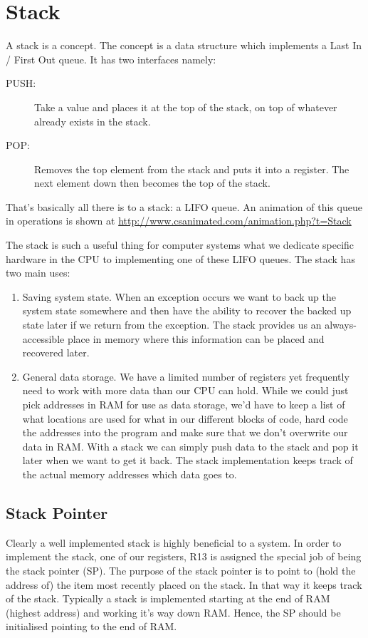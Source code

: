 \chapter{Stack}
A stack is a concept. The concept is a data structure which implements a Last In / First Out queue. It has two interfaces namely:
\begin{description}
    \item[PUSH:] Take a value and places it at the top of the stack, on top of whatever already exists in the stack.
    \item[POP:] Removes the top element from the stack and puts it into a register. The next element down then becomes the top of the stack.
\end{description}

That's basically all there is to a stack: a LIFO queue. An animation of this queue in operations is shown at \url{http://www.csanimated.com/animation.php?t=Stack}

The stack is such a useful thing for computer systems what we dedicate specific hardware in the CPU to implementing one of these LIFO queues. The stack has two main uses:
\begin{enumerate}
    \item Saving system state. When an exception occurs we want to back up the system state somewhere and then have the ability to recover the backed up state later if we return from the exception. The stack provides us an always-accessible place in memory where this information can be placed and recovered later.
    \item General data storage. We have a limited number of registers yet frequently need to work with more data than our CPU can hold. While we could just pick addresses in RAM for use as data storage, we'd have to keep a list of what locations are used for what in our different blocks of code, hard code the addresses into the program and make sure that we don't overwrite our data in RAM. With a stack we can simply push data to the stack and pop it later when we want to get it back. The stack implementation keeps track of the actual memory addresses which data goes to. 
\end{enumerate}

\section{Stack Pointer}
Clearly a well implemented stack is highly beneficial to a system. In order to implement the stack, one of our registers, R13 is assigned the special job of being the stack pointer (SP). The purpose of the stack pointer is to point to (hold the address of) the item most recently placed on the stack. In that way it keeps track of the stack. Typically a stack is implemented starting at the end of RAM (highest address) and working it's way down RAM. Hence, the SP should be initialised pointing to the end of RAM.

